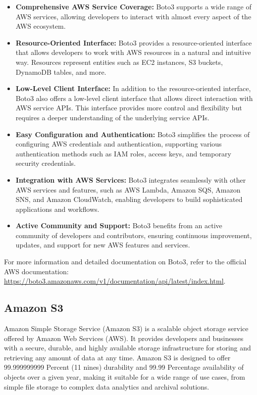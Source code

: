 \documentclass[11pt]{article}
\begin{document}
\begin{itemize}
    \item \textbf{Comprehensive AWS Service Coverage:} Boto3 supports a wide range of AWS services, allowing developers to interact with almost every aspect of the AWS ecosystem.
    \item \textbf{Resource-Oriented Interface:} Boto3 provides a resource-oriented interface that allows developers to work with AWS resources in a natural and intuitive way. Resources represent entities such as EC2 instances, S3 buckets, DynamoDB tables, and more.
    \item \textbf{Low-Level Client Interface:} In addition to the resource-oriented interface, Boto3 also offers a low-level client interface that allows direct interaction with AWS service APIs. This interface provides more control and flexibility but requires a deeper understanding of the underlying service APIs.
    \item \textbf{Easy Configuration and Authentication:} Boto3 simplifies the process of configuring AWS credentials and authentication, supporting various authentication methods such as IAM roles, access keys, and temporary security credentials.
    \item \textbf{Integration with AWS Services:} Boto3 integrates seamlessly with other AWS services and features, such as AWS Lambda, Amazon SQS, Amazon SNS, and Amazon CloudWatch, enabling developers to build sophisticated applications and workflows.
    \item \textbf{Active Community and Support:} Boto3 benefits from an active community of developers and contributors, ensuring continuous improvement, updates, and support for new AWS features and services.
\end{itemize}

For more information and detailed documentation on Boto3, refer to the official AWS documentation: \url{https://boto3.amazonaws.com/v1/documentation/api/latest/index.html}.

\subsection{Amazon S3}

Amazon Simple Storage Service (Amazon S3) is a scalable object storage service offered by Amazon Web Services (AWS). It provides developers and businesses with a secure, durable, and highly available storage infrastructure for storing and retrieving any amount of data at any time. Amazon S3 is designed to offer 99.999999999 Percent (11 nines) durability and 99.99 Percentage availability of objects over a given year, making it suitable for a wide range of use cases, from simple file storage to complex data analytics and archival solutions.
\end{document}
